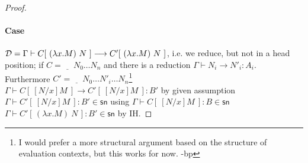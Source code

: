 \documentclass{article}
\newcommand{\csn}{\mathsf{sn}}
\newcommand{\red}{\longrightarrow}
\begin{document}
\begin{proof}
\paragraph{Case} $\D = \Gamma \vdash C[~(\lambda x.M)~N~] \red C'[~(\lambda x.M)~N~]$, i.e. we reduce, but not in a head position; if $C = \underline{\quad}~N_0\ldots N_n$ and there is a reduction $\Gamma \vdash N_i \red N'_i : A_i$. Furthermore $C' = \underline{\quad}~N_0\ldots N'_i \ldots N_n$\footnote{I would prefer a more structural argument based on the structure of evaluation contexts, but this works for now. -bp}
\\[0.5em]
$\Gamma \vdash  C[~[N/x]M~] \red  C'[~[N/x]M~] : B'$ \hfill by given assumption \\
$\Gamma \vdash C'[~[N/x]M~] : B' \in \csn$ \hfill using  $\Gamma \vdash C[~[N/x]M~] : B \in \csn$ 
\\
$\Gamma \vdash C'[\,(\lambda x.M)~N\,] : B' \in \csn$ \hfill by IH.



\end{proof}
\end{document}
